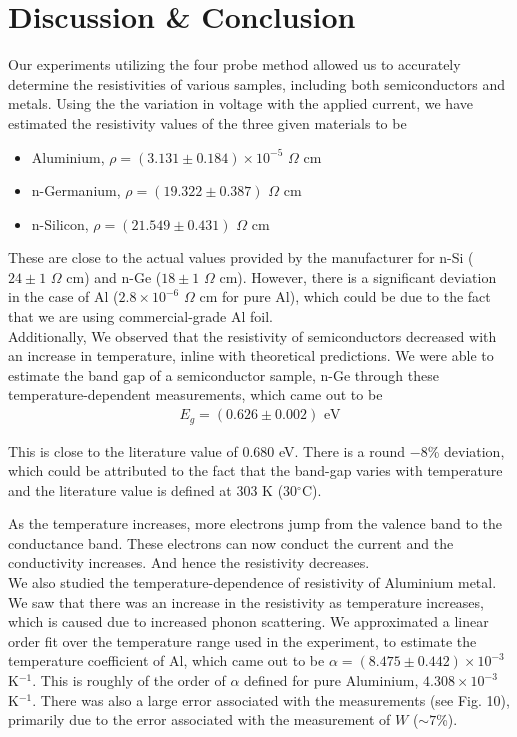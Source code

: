 \section{Discussion \& Conclusion}
Our experiments utilizing the four probe method allowed us to accurately determine the resistivities of various samples, including both semiconductors and metals.
Using the the variation in voltage with the applied current, we have estimated the resistivity values of the three given materials to be

\begin{itemize}
    \item Aluminium, $\rho = (3.131 \pm 0.184) \times 10^{-5}\,\,\Omega$ cm
    \item n-Germanium, $\rho = (19.322 \pm 0.387)\,\,\Omega$ cm
    \item n-Silicon, $\rho = (21.549 \pm 0.431)\,\,\Omega$ cm\\
\end{itemize}

These are close to the actual values provided by the manufacturer for n-Si ($24 \pm 1\,\,\Omega$ cm) and n-Ge ($18 \pm 1\,\,\Omega$ cm). However, there is a significant deviation in the case of Al ($2.8 \times 10^{-6}\,\,\Omega$ cm for pure Al), which could be due to the fact that we are using commercial-grade Al foil.\\

Additionally, We observed that the resistivity of semiconductors decreased with an increase in temperature, inline with theoretical predictions. We were able to estimate the band gap of a semiconductor sample, n-Ge through these temperature-dependent measurements, which came out to be 
\vspace{-1em}
\begin{align*}
    E_g = (0.626 \pm 0.002) \text{ eV}
\end{align*}

This is close to the literature value of 0.680 eV. There is a round $-8$\% deviation, which could be attributed to the fact that the band-gap varies with temperature and the literature value is defined at 303 K (30$^\circ$C).

As the temperature increases, more electrons jump from the valence band to the conductance band. These electrons can now conduct the current and the conductivity increases.
And hence the resistivity decreases.\\

We also studied the temperature-dependence of resistivity of Aluminium metal. We saw that there was an increase in the resistivity as temperature increases, which is caused due to increased phonon scattering. We approximated a linear order fit over the temperature range used in the experiment, to estimate the temperature coefficient of Al, which came out to be $\alpha = (8.475 \pm 0.442) \times 10^{-3}$ K$^{-1}$. This is roughly of the order of $\alpha$ defined for pure Aluminium, $4.308\times 10^{-3}$ K$^{-1}$. There was also a large error associated with the measurements (see Fig. 10), primarily due to the error associated with the measurement of $W$ ($\sim 7$\%).\\

